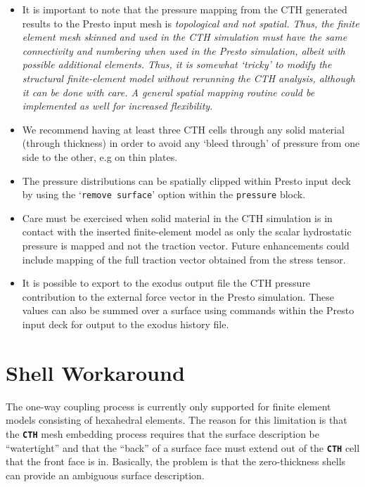 \documentclass[11pt,twoside]{article}
\newcommand{\cmd}[1]
   {\mbox{\tt #1}\null}
\newcommand{\code}[1]
   {\mbox{\bf\tt #1}\null}
\begin{document}
\begin{itemize}
\item It is important to note that the pressure mapping from the CTH generated
results to the Presto input mesh is \em{topological} and not \em{spatial}.
 Thus, the finite element mesh skinned and used in the CTH simulation
must have the same connectivity and numbering when used in the Presto
simulation, albeit with possible additional elements.  Thus, it is
somewhat `tricky' to modify the structural finite{}-element model
without rerunning the CTH analysis, although it can be done with care.
 A general spatial mapping routine could be implemented as well for
increased flexibility.

\item We recommend having at least three CTH cells through any solid material
(through thickness) in order to avoid any `bleed through' of pressure
from one side to the other, e.g on thin plates.

\item The pressure distributions can be spatially clipped within Presto input
deck by using the `\cmd{remove surface}' option within the
\cmd{pressure} block.

\item Care must be exercised when solid material in the CTH simulation is in
contact with the inserted finite{}-element model as only the scalar
hydrostatic pressure is mapped and not the traction vector.  Future
enhancements could include mapping of the full traction vector obtained
from the stress tensor.

\item It is possible to export to the exodus output file the CTH pressure
contribution to the external force vector in the Presto simulation.
 These values can also be summed over a surface using commands within
the Presto input deck for output to the exodus history file.

\end{itemize}

\section{Shell Workaround}\label{sec:shell}

The one-way coupling process is currently only supported for finite
element models consisting of hexahedral elements.  The reason for this
limitation is that the \code{CTH} mesh embedding process requires that the
surface description be ``watertight'' and that the ``back'' of a
surface face must extend out of the \code{CTH} cell that the front
face is in.  Basically, the problem is that the zero-thickness shells
can provide an ambiguous surface description.
\end{document}
